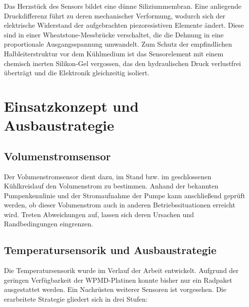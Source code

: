 Das Herzstück des Sensors bildet eine dünne Siliziummembran. Eine anliegende Druckdifferenz führt zu deren mechanischer Verformung, wodurch sich der elektrische Widerstand der aufgebrachten piezoresistiven Elemente ändert. Diese sind in einer Wheatstone-Messbrücke verschaltet, die die Dehnung in eine proportionale Ausgangsspannung umwandelt. Zum Schutz der empfindlichen Halbleiterstruktur vor dem Kühlmedium ist das Sensorelement mit einem chemisch inerten Silikon-Gel vergossen, das den hydraulischen Druck verlustfrei überträgt und die Elektronik gleichzeitig isoliert.

\section{Einsatzkonzept und Ausbaustrategie}
\label{sec:einsatzkonzept}

\subsection{Volumenstromsensor}
\label{subsec:einsatz_volumenstrom}

Der Volumenstromsensor dient dazu, im Stand bzw. im geschlossenen
Kühlkreislauf den Volumenstrom zu bestimmen. Anhand der bekannten
Pumpenkennlinie und der Stromaufnahme der Pumpe kann anschließend geprüft
werden, ob dieser Volumenstrom auch in anderen Betriebssituationen erreicht
wird. Treten Abweichungen auf, lassen sich deren Ursachen und Randbedingungen
eingrenzen.

\subsection{Temperatursensorik und Ausbaustrategie}
\label{subsec:ausbaustrategie}

Die Temperatursensorik wurde im Verlauf der Arbeit entwickelt. Aufgrund der
geringen Verfügbarkeit der WPMD-Platinen konnte bisher nur ein Radpaket
ausgestattet werden. Ein Nachrüsten weiterer Sensoren ist vorgesehen.
Die erarbeitete Strategie gliedert sich in drei Stufen:

